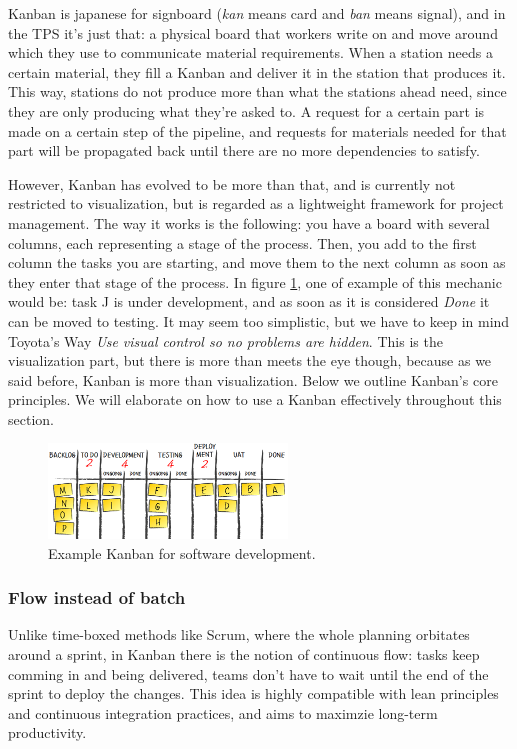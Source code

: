 \documentclass[conference]{IEEEtran}
\begin{document}
Kanban is japanese for signboard (\textit{kan} means card and \textit{ban} means signal)\cite{kanban_def}, and in
the TPS it's just that: a physical board that workers write on and move around
which they use to communicate material requirements. When a station needs a certain
material, they fill a Kanban and deliver it in the station that produces it.
This way, stations do not produce more than what the stations ahead need, since they are
only producing what they're asked to. A request for a certain part is made on a certain
step of the pipeline, and requests for materials needed for that part will be propagated back
until there are no more dependencies to satisfy.

However, Kanban has evolved to be more than that, and is currently not restricted to visualization,
but is regarded as a lightweight framework for project management. The way it works is the
following: you have a board with several columns, each representing a stage of the process.
Then, you add to the first column the tasks you are starting, and move them to the next
column as soon as they enter that stage of the process.
In figure \ref{kanban_dev}, one of example of this mechanic would be: task J is under
development, and as soon as it is considered \textit{Done} it can be moved to testing.
 It may seem too simplistic, but we have to keep in mind Toyota's Way \textit{Use visual control so no problems are
hidden}. This is the visualization part, but there is more than meets the eye though, because as we said before,
Kanban is more than visualization. Below we outline Kanban's core principles.
We will elaborate on how to use a Kanban effectively throughout this section.

\begin{figure}%
\centering
\includegraphics[width=2.5in]{kanban-board}
\caption{Example Kanban for software development.\cite{kanban_fig}}
\label{kanban_dev}
\end{figure}

\subsubsection{Flow instead of batch}
Unlike time-boxed methods like Scrum, where the whole planning orbitates around
a sprint, in Kanban there is the notion of continuous flow: tasks keep comming
in and being delivered, teams don't have to wait until the end of the sprint
to deploy the changes. This idea is highly compatible with lean principles and
continuous integration practices, and aims to maximzie long-term productivity.
\end{document}
